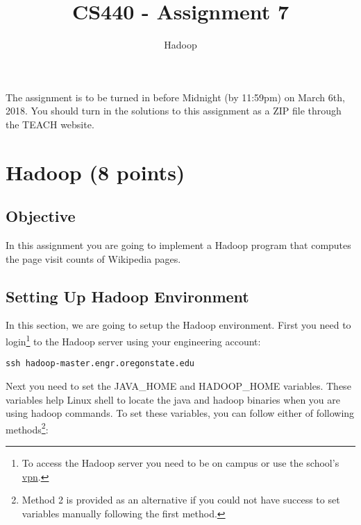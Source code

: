 \documentclass[11pt]{article}
\begin{document}
\title{CS440 - Assignment 7}
\author{Hadoop}
\maketitle
\noindent 
The assignment is to be turned in before Midnight (by 11:59pm) on March 6th, 2018. You should turn in the solutions to this assignment as a ZIP file through the TEACH website. %


\section{Hadoop (8 points)}

\subsection*{Objective}
In this assignment you are going to implement a Hadoop program that computes the page visit counts of Wikipedia pages.

\subsection*{Setting Up Hadoop Environment}
In this section, we are going to setup the Hadoop environment. First you need to login\footnote{To access the Hadoop server you need to be on campus or use the school's \href{http://oregonstate.edu/helpdocs/network-and-phone/virtual-private-network-vpn}{vpn}.} to the Hadoop server using your engineering account:
\begin{verbatim}
ssh hadoop-master.engr.oregonstate.edu
\end{verbatim}

\noindent Next you need to set the JAVA\_HOME and HADOOP\_HOME variables. These variables help Linux shell to locate the java and hadoop binaries when you are using hadoop commands. To set these variables, you can follow either of following methods\footnote{Method 2 is provided as an alternative if you could not have success to set variables manually following the first method.}:
\end{document}
